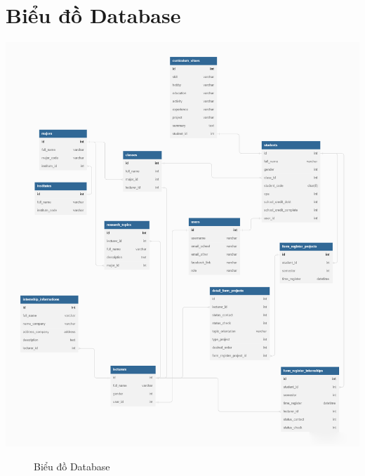 \section{Biểu đồ Database}

    \begin{center}
      \includegraphics[width=1.1\textwidth]{./diagram/manage-students.png}
      \begin{figure}[h]
        \centering
        \caption{Biểu đồ Database}
      \end{figure}
    \end{center}